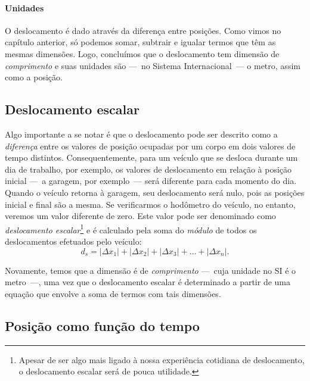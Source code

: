 \paragraph{Unidades}

O deslocamento é dado através da diferença entre posições. Como vimos no capítulo anterior, só podemos somar, subtrair e igualar termos que têm as mesmas dimensões. Logo, concluímos que o deslocamento tem dimensão de \emph{comprimento} e suas unidades são ---~no Sistema Internacional~--- o metro, assim como a posição.

\subsection{Deslocamento escalar}

Algo importante a se notar é que o deslocamento pode ser descrito como a \emph{diferença} entre os valores de posição ocupadas por um corpo em dois valores de tempo distintos. Consequentemente, para um veículo que se desloca durante um dia de trabalho, por exemplo, os valores de deslocamento em relação à posição inicial ---~a garagem, por exemplo~--- será diferente para cada momento do dia. Quando o veículo retorna à garagem, seu deslocamento será nulo, pois as posições inicial e final são a mesma. Se verificarmos o hodômetro do veículo, no entanto, veremos um valor diferente de zero. Este valor pode ser denominado como \emph{deslocamento escalar}\footnote{Apesar de ser algo mais ligado à nossa experiência cotidiana de deslocamento, o deslocamento escalar será de pouca utilidade.} e é calculado pela soma do \emph{módulo} de todos os deslocamentos efetuados pelo veículo:
\begin{equation}
  d_s = |\Delta x_1| + |\Delta x_2| + |\Delta x_3| + \dots + |\Delta x_n|.
\end{equation}

Novamente, temos que a dimensão é de \emph{comprimento} ---~cuja unidade no SI é o metro~---, uma vez que o deslocamento escalar é determinado a partir de uma equação que envolve a soma de termos com tais dimensões.


\subsection{Posição como função do tempo}

